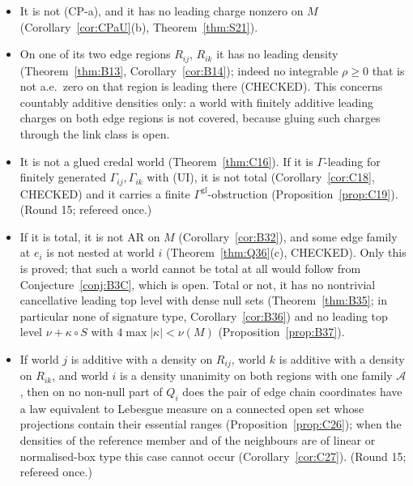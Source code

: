 \documentclass[11pt]{article}
\theoremstyle{definition}
\theoremstyle{remark}
\begin{document}
\begin{itemize}[leftmargin=*]
\item It is not (CP-a), and it has no leading charge nonzero on $M$ (Corollary~\ref{cor:CPaU}(b), Theorem~\ref{thm:S21}).
\item On one of its two edge regions $R_{ij}$, $R_{ik}$ it has no leading density (Theorem~\ref{thm:B13}, Corollary~\ref{cor:B14}); indeed no integrable $\rho\ge0$ that is not a.e.\ zero on that region is leading there (CHECKED). This concerns countably additive densities only: a world with finitely additive leading charges on both edge regions is not covered, because gluing such charges through the link class is open.
\item It is not a glued credal world (Theorem~\ref{thm:C16}). If it is $\Gamma$-leading for finitely generated $\Gamma_{ij},\Gamma_{ik}$ with (UI), it is not total (Corollary~\ref{cor:C18}, CHECKED) and it carries a finite $\Gamma^{\mathrm{gl}}$-obstruction (Proposition~\ref{prop:C19}). (Round 15; refereed once.)
\item If it is total, it is not AR on $M$ (Corollary~\ref{cor:B32}), and some edge family at $e_i$ is not nested at world $i$ (Theorem~\ref{thm:Q36}(c), CHECKED). Only this is proved; that such a world cannot be total at all would follow from Conjecture~\ref{conj:B3C}, which is open. Total or not, it has no nontrivial cancellative leading top level with dense null sets (Theorem~\ref{thm:B35}; in particular none of signature type, Corollary~\ref{cor:B36}) and no leading top level $\nu+\kappa\circ S$ with $4\max|\kappa|<\nu(M)$ (Proposition~\ref{prop:B37}).
\item If world $j$ is additive with a density on $R_{ij}$, world $k$ is additive with a density on $R_{ik}$, and world $i$ is a density unanimity on both regions with one family $\mathcal A$, then on no non-null part of $Q_i$ does the pair of edge chain coordinates have a law equivalent to Lebesgue measure on a connected open set whose projections contain their essential ranges (Proposition~\ref{prop:C26}); when the densities of the reference member and of the neighbours are of linear or normalised-box type this case cannot occur (Corollary~\ref{cor:C27}). (Round 15; refereed once.)
\end{itemize}
\end{document}

